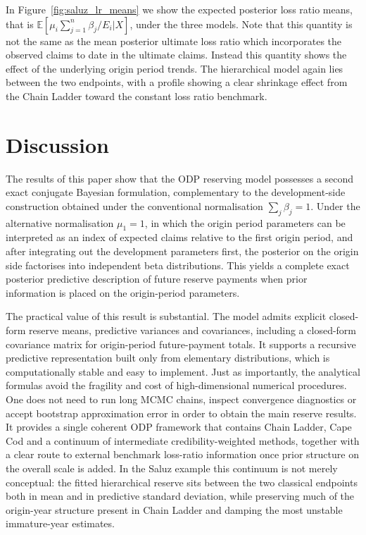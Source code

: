 \documentclass[11pt]{article}
\newcommand{\1}{\mathbf{1}}
\begin{document}
In Figure~\ref{fig:saluz_lr_means} we show the expected posterior loss ratio means, 
that is $\mathbb{E}[\mu_i \sum_{j=1}^n{\beta_j}/E_i|X]$, under the three models. Note that this
quantity is not the same as the mean posterior ultimate loss ratio which incorporates the observed claims to date in the ultimate claims. Instead this quantity shows
the effect of the underlying origin period trends. 
The hierarchical model again lies between the two endpoints, with a profile showing a clear shrinkage effect from the Chain Ladder toward the constant loss ratio benchmark.

\section{Discussion}\label{sec:discussion}

The results of this paper show that the ODP reserving model possesses a second exact conjugate Bayesian formulation, complementary to the development-side construction obtained under the conventional normalisation $\sum_j\beta_j=1$. 
Under the alternative normalisation $\mu_1=1$, in which the origin period parameters can be interpreted as an index
of expected claims relative to the first origin period, and after integrating out the development parameters first, 
the posterior on the origin side factorises into independent beta distributions. This yields a complete exact posterior predictive description of future reserve payments when prior information is placed on the origin-period parameters.

The practical value of this result is substantial. The model admits explicit closed-form reserve means, predictive variances and covariances, including a closed-form covariance matrix for origin-period future-payment totals. It supports a recursive predictive representation built only from elementary distributions, which is computationally stable and easy to implement. Just as importantly, the analytical formulas avoid the fragility and cost of high-dimensional numerical procedures. One does not need to run long MCMC chains, inspect convergence diagnostics or accept bootstrap approximation error in order to obtain the main reserve results. It provides a single coherent ODP framework that contains Chain Ladder, Cape Cod and a continuum of intermediate credibility-weighted methods, together with a clear route to external benchmark loss-ratio information once prior structure on the overall scale is added. In the Saluz example this continuum is not merely conceptual: the fitted hierarchical reserve sits between the two classical endpoints both in mean and in predictive standard deviation, while preserving much of the origin-year structure present in Chain Ladder and damping the most unstable immature-year estimates.
\end{document}
